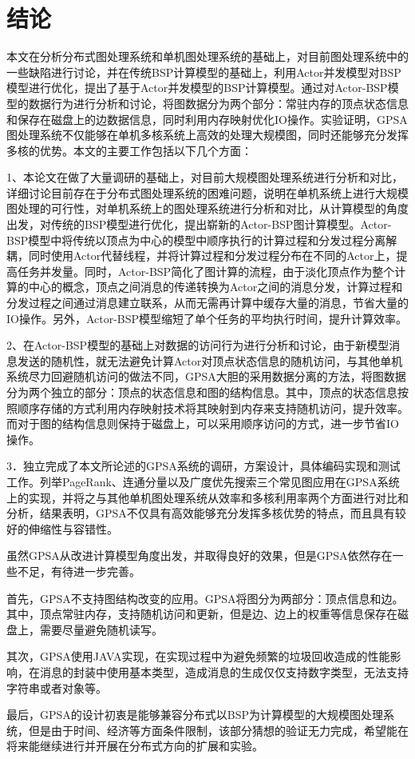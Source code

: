 
\chapter*{结\quad 论}




本文在分析分布式图处理系统和单机图处理系统的基础上，对目前图处理系统中的一些缺陷进行讨论，并在传统BSP计算模型的基础上，利用Actor并发模型对BSP模型进行优化，提出了基于Actor并发模型的BSP计算模型。通过对Actor-BSP模型的数据行为进行分析和讨论，将图数据分为两个部分：常驻内存的顶点状态信息和保存在磁盘上的边数据信息，同时利用内存映射优化IO操作。实验证明，GPSA图处理系统不仅能够在单机多核系统上高效的处理大规模图，同时还能够充分发挥多核的优势。本文的主要工作包括以下几个方面：

1、本论文在做了大量调研的基础上，对目前大规模图处理系统进行分析和对比，详细讨论目前存在于分布式图处理系统的困难问题，说明在单机系统上进行大规模图处理的可行性，对单机系统上的图处理系统进行分析和对比，从计算模型的角度出发，对传统的BSP模型进行优化，提出崭新的Actor-BSP图计算模型。Actor-BSP模型中将传统以顶点为中心的模型中顺序执行的计算过程和分发过程分离解耦，同时使用Actor代替线程，并将计算过程和分发过程分布在不同的Actor上，提高任务并发量。同时，Actor-BSP简化了图计算的流程，由于淡化顶点作为整个计算的中心的概念，顶点之间消息的传递转换为Actor之间的消息分发，计算过程和分发过程之间通过消息建立联系，从而无需再计算中缓存大量的消息，节省大量的IO操作。另外，Actor-BSP模型缩短了单个任务的平均执行时间，提升计算效率。

2、在Actor-BSP模型的基础上对数据的访问行为进行分析和讨论，由于新模型消息发送的随机性，就无法避免计算Actor对顶点状态信息的随机访问，与其他单机系统尽力回避随机访问的做法不同，GPSA大胆的采用数据分离的方法，将图数据分为两个独立的部分：顶点的状态信息和图的结构信息。其中，顶点的状态信息按照顺序存储的方式利用内存映射技术将其映射到内存来支持随机访问，提升效率。而对于图的结构信息则保持于磁盘上，可以采用顺序访问的方式，进一步节省IO操作。


3．独立完成了本文所论述的GPSA系统的调研，方案设计，具体编码实现和测试工作。列举PageRank、连通分量以及广度优先搜索三个常见图应用在GPSA系统上的实现，并将之与其他单机图处理系统从效率和多核利用率两个方面进行对比和分析，结果表明，GPSA不仅具有高效能够充分发挥多核优势的特点，而且具有较好的伸缩性与容错性。

虽然GPSA从改进计算模型角度出发，并取得良好的效果，但是GPSA依然存在一些不足，有待进一步完善。

首先，GPSA不支持图结构改变的应用。GPSA将图分为两部分：顶点信息和边。其中，顶点常驻内存，支持随机访问和更新，但是边、边上的权重等信息保存在磁盘上，需要尽量避免随机读写。

其次，GPSA使用JAVA实现，在实现过程中为避免频繁的垃圾回收造成的性能影响，在消息的封装中使用基本类型，造成消息的生成仅仅支持数字类型，无法支持字符串或者对象等。

最后，GPSA的设计初衷是能够兼容分布式以BSP为计算模型的大规模图处理系统，但是由于时间、经济等方面条件限制，该部分猜想的验证无力完成，希望能在将来能继续进行并开展在分布式方向的扩展和实验。
